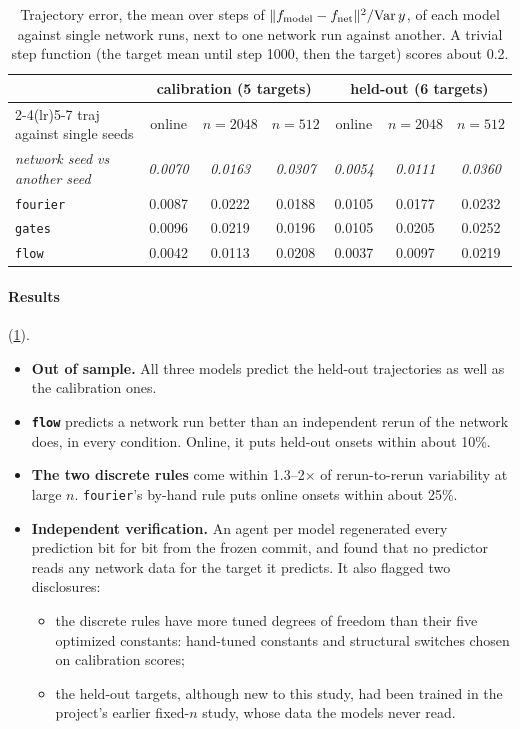 \begin{table}[t]
\centering\footnotesize\setlength{\tabcolsep}{4pt}
\begin{tabular}{lcccccc}
\toprule
& \multicolumn{3}{c}{calibration (5 targets)} & \multicolumn{3}{c}{held-out (6 targets)}\\
\cmidrule(lr){2-4}\cmidrule(lr){5-7}
traj against single seeds & online & $n=2048$ & $n=512$ & online & $n=2048$ & $n=512$\\
\midrule
\emph{network seed vs another seed} & \emph{0.0070} & \emph{0.0163} & \emph{0.0307} & \emph{0.0054} & \emph{0.0111} & \emph{0.0360}\\
\texttt{fourier} & 0.0087 & 0.0222 & 0.0188 & 0.0105 & 0.0177 & 0.0232\\
\texttt{gates} & 0.0096 & 0.0219 & 0.0196 & 0.0105 & 0.0205 & 0.0252\\
\texttt{flow} & 0.0042 & 0.0113 & 0.0208 & 0.0037 & 0.0097 & 0.0219\\
\bottomrule
\end{tabular}
\caption{Trajectory error, the mean over steps of $\lVert f_{\rm model}-f_{\rm net}\rVert^2/\mathrm{Var}\,y$, of each model against single network runs, next to one network run against another. A trivial step function (the target mean until step 1000, then the target) scores about 0.2.}
\label{tab:trajectories}
\end{table}

\paragraph{Results}  (\cref{tab:trajectories}).
\begin{itemize}
\item \textbf{Out of sample.} All three models predict the held-out trajectories as well as the calibration ones.
\item \textbf{\texttt{flow}} predicts a network run better than an independent rerun of the network does, in every condition. Online, it puts held-out onsets within about 10\%.
\item \textbf{The two discrete rules} come within 1.3–2$\times$ of rerun-to-rerun variability at large $n$. \texttt{fourier}'s by-hand rule puts online onsets within about 25\%.
\item \textbf{Independent verification.} An agent per model regenerated every prediction bit for bit from the frozen commit, and found that no predictor reads any network data for the target it predicts. It also flagged two disclosures:
  \begin{itemize}
  \item the discrete rules have more tuned degrees of freedom than their five optimized constants: hand-tuned constants and structural switches chosen on calibration scores;
  \item the held-out targets, although new to this study, had been trained in the project's earlier fixed-$n$ study, whose data the models never read.
  \end{itemize}
\end{itemize}


